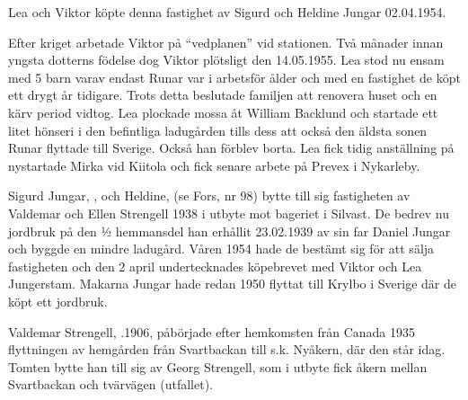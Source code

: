 Lea och Viktor köpte denna fastighet av Sigurd och Heldine Jungar 02.04.1954.
\begin{jhchildren}
  \item {}
  \item {}
  \item {}
  \item {}
\end{jhchildren}

Efter kriget arbetade Viktor på ``vedplanen'' vid stationen. Två månader innan yngsta dotterns födelse dog Viktor plötsligt den 14.05.1955. Lea stod nu ensam med 5 barn varav endast Runar var i arbetsför ålder och med en fastighet de köpt ett drygt år tidigare. Trots detta beslutade familjen att renovera huset och en kärv period vidtog. Lea plockade mossa åt William Backlund och startade ett litet hönseri i den befintliga ladugården tills dess att också den äldsta sonen Runar flyttade till Sverige. Också han förblev borta. Lea fick tidig anställning på nystartade Mirka vid Kiitola och fick senare arbete på Prevex i Nykarleby.


Sigurd Jungar, , och Heldine,  (se Fors, nr 98) bytte till sig fastigheten av Valdemar och Ellen Strengell 1938 i utbyte mot bageriet i Silvast. De bedrev nu jordbruk på den ½ hemmansdel han erhållit 23.02.1939 av sin far Daniel Jungar och byggde en mindre ladugård. Våren 1954 hade de bestämt sig för att sälja fastigheten och den 2 april undertecknades köpebrevet med Viktor och Lea Jungerstam. Makarna Jungar hade redan 1950 flyttat till Krylbo i Sverige där de köpt ett jordbruk.



Valdemar Strengell, .1906, påbörjade efter hemkomsten från Canada 1935 flyttningen av hemgården från Svartbackan till s.k. Nyåkern, där den står idag. Tomten bytte han till sig av Georg Strengell, som i utbyte fick åkern mellan Svartbackan och tvärvägen (utfallet).

